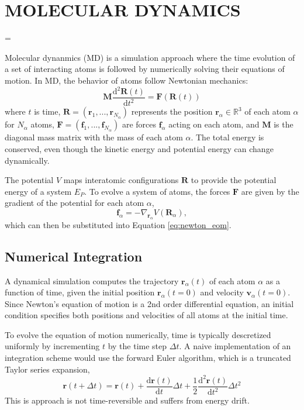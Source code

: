 \chapter{MOLECULAR DYNAMICS}
\label{ch:md}
\hfuzz=20pt
\vfuzz=20pt
\vbadness=\maxdimen

Molecular dynanmics (MD) is a simulation approach where the time evolution of a set of interacting atoms is followed by numerically solving their equations of motion.  In MD, the behavior of atoms follow Newtonian mechanics:
\begin{equation}
	  \label{eq:newton_eom}
    \bm{M}\frac{\mathrm{d}^2\bm{R}(t)}
		           {\mathrm{d} t^2}
		=
		\bm{F}(\bm{R}(t))
\end{equation}
where $t$ is time,
$\bm{R} = (\bm{r}_1,...,\bm{r}_{N_\alpha})$ represents the position $\bm{r}_\alpha \in \mathbb{R}^3$ of each atom $\alpha$ for $N_\alpha$ atoms,
$\bm{F} = (\bm{f}_1,...,\bm{f}_{N_\alpha})$ are forces $\bm{f}_\alpha$ acting on each atom,
and $\bm{M}$ is the diagonal mass matrix with the mass of each atom $\alpha$.
The total energy is conserved, even though the kinetic energy and potential energy can change dynamically.

The potential $V$ maps interatomic configurations $\bm{R}$ to provide the potential energy of a system $E_P$.  To evolve a system of atoms, the forces $\bm{F}$ are given by the gradient of the potential for each atom $\alpha$,
\begin{equation}
	\label{eq:calc_forces_from_potential}
	 \bm{f}_\alpha
	 =
	 -\nabla_{\bm{r}_\alpha} V(\bm{R}_\alpha),
\end{equation}
 which can then be substituted into Equation \ref{eq:newton_eom}.

\section{Numerical Integration}
A dynamical simulation computes the trajectory $\bm{r}_\alpha(t)$ of each atom $\alpha$ as a function of time, given the initial position $\bm{r}_\alpha(t=0)$ and velocity $\bm{v}_\alpha(t=0)$.  Since Newton's equation of motion is a 2nd order differential equation, an initial condition specifies both positions and velocities of all atoms at the initial time.

To evolve the equation of motion numerically, time is typically descretized uniformly by incrementing $t$ by the time step $\Delta t$.  A naive implementation of an integration scheme would use the forward Euler algorithm, which is a truncated Taylor series expansion,
\begin{equation}
	\bm{r}(t+\Delta t)
	=
	\bm{r}(t)
	+ \frac{\mathrm{d} \bm{r}(t)}
	       {\mathrm{d}t}
		\Delta t
	+ \frac{1}{2}
	  \frac{\mathrm{d}^2 \bm{r}(t)}
		     {\mathrm{d}t^2}
		\Delta t^2
\end{equation}
This is approach is not time-reversible and suffers from energy drift\cite{allen1987_md}.

